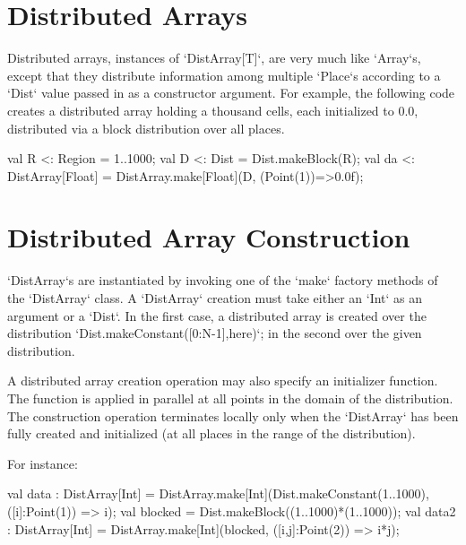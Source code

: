 \section{Distributed Arrays}

Distributed arrays, instances of \xcd`DistArray[T]`, are very much like
\xcd`Array`s, except that they distribute information among multiple
\xcd`Place`s according to a \xcd`Dist` value passed in as a constructor
argument.  For example, the following code creates a distributed array holding
a thousand cells, each initialized to 0.0, distributed via a block
distribution over all places.
\begin{xten}
val R <: Region = 1..1000;
val D <: Dist = Dist.makeBlock(R);
val da <: DistArray[Float] = DistArray.make[Float](D, (Point(1))=>0.0f);
\end{xten}




\section{Distributed Array Construction}\label{ArrayInitializer}

\xcd`DistArray`s are instantiated by invoking one of the \xcd`make` factory
methods of the \xcd`DistArray` class.
A \xcd`DistArray` creation 
must take either an \xcd`Int` as an argument or a \xcd`Dist`. In the first
case,  a distributed array is created over the distribution \xcd`Dist.makeConstant([0:N-1],here)`;
in the second over the given distribution. 

A distributed array creation operation may also specify an initializer
function.
The function is applied in parallel
at all points in the domain of the distribution. The
construction operation terminates locally only when the \xcd`DistArray` has been
fully created and initialized (at all places in the range of the
distribution).

For instance:
\begin{xten}
val data : DistArray[Int]
    = DistArray.make[Int](Dist.makeConstant(1..1000), ([i]:Point(1)) => i);
val blocked = Dist.makeBlock((1..1000)*(1..1000));
val data2 : DistArray[Int]
    = DistArray.make[Int](blocked, ([i,j]:Point(2)) => i*j);
\end{xten}


